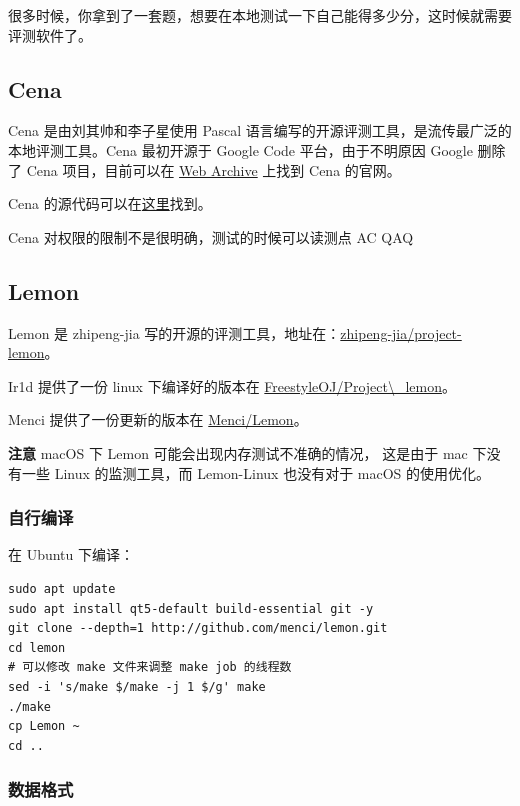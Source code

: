 
很多时候，你拿到了一套题，想要在本地测试一下自己能得多少分，这时候就需要评测软件了。

\subsection{Cena}

Cena 是由刘其帅和李子星使用 Pascal 语言编写的开源评测工具，是流传最广泛的本地评测工具。Cena 最初开源于 Google Code 平台，由于不明原因 Google 删除了 Cena 项目，目前可以在 \href{https://web.archive.org/web/20131023112258/http://code.google.com/p/cena/}{Web Archive} 上找到 Cena 的官网。

Cena 的源代码可以在\href{https://github.com/billchenchina/cena}{这里}找到。

Cena 对权限的限制不是很明确，测试的时候可以读测点 AC QAQ

\subsection{Lemon}

Lemon 是 zhipeng-jia 写的开源的评测工具，地址在：\href{https://github.com/zhipeng-jia/project-lemon}{zhipeng-jia/project-lemon}。

Ir1d 提供了一份 linux 下编译好的版本在 \href{https://github.com/FreestyleOJ/Project_lemon/tree/Built}{FreestyleOJ/Project\textbackslash{}\_lemon}。

Menci 提供了一份更新的版本在 \href{https://github.com/Menci/Lemon/}{Menci/Lemon}。

\textbf{注意} macOS 下 Lemon 可能会出现内存测试不准确的情况， 这是由于 mac 下没有一些 Linux 的监测工具，而 Lemon-Linux 也没有对于 macOS 的使用优化。

\subsubsection{自行编译}

在 Ubuntu 下编译：

\begin{verbatim}
sudo apt update
sudo apt install qt5-default build-essential git -y
git clone --depth=1 http://github.com/menci/lemon.git
cd lemon
# 可以修改 make 文件来调整 make job 的线程数
sed -i 's/make $/make -j 1 $/g' make
./make
cp Lemon ~
cd ..
\end{verbatim}

\subsubsection{数据格式}

